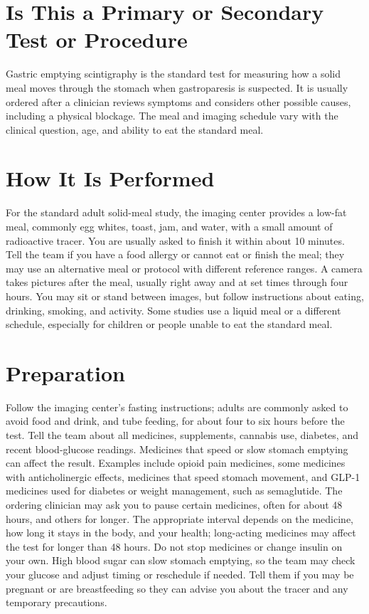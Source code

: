 \section*{Is This a Primary or Secondary Test or Procedure}
Gastric emptying scintigraphy is the standard test for measuring how a solid meal moves through the stomach when gastroparesis is suspected. It is usually ordered after a clinician reviews symptoms and considers other possible causes, including a physical blockage. The meal and imaging schedule vary with the clinical question, age, and ability to eat the standard meal.

\section*{How It Is Performed}
For the standard adult solid-meal study, the imaging center provides a low-fat meal, commonly egg whites, toast, jam, and water, with a small amount of radioactive tracer. You are usually asked to finish it within about 10 minutes. Tell the team if you have a food allergy or cannot eat or finish the meal; they may use an alternative meal or protocol with different reference ranges. A camera takes pictures after the meal, usually right away and at set times through four hours. You may sit or stand between images, but follow instructions about eating, drinking, smoking, and activity. Some studies use a liquid meal or a different schedule, especially for children or people unable to eat the standard meal.

\section*{Preparation}
Follow the imaging center's fasting instructions; adults are commonly asked to avoid food and drink, and tube feeding, for about four to six hours before the test. Tell the team about all medicines, supplements, cannabis use, diabetes, and recent blood-glucose readings. Medicines that speed or slow stomach emptying can affect the result. Examples include opioid pain medicines, some medicines with anticholinergic effects, medicines that speed stomach movement, and GLP-1 medicines used for diabetes or weight management, such as semaglutide. The ordering clinician may ask you to pause certain medicines, often for about 48 hours, and others for longer. The appropriate interval depends on the medicine, how long it stays in the body, and your health; long-acting medicines may affect the test for longer than 48 hours. Do not stop medicines or change insulin on your own. High blood sugar can slow stomach emptying, so the team may check your glucose and adjust timing or reschedule if needed. Tell them if you may be pregnant or are breastfeeding so they can advise you about the tracer and any temporary precautions.

